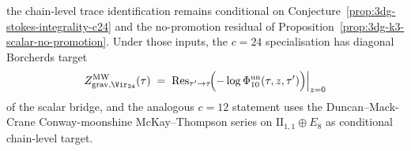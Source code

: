 \begin{conjecture}
\begin{enumerate}[label=\textup{(\Alph*)}]
the chain-level trace identification remains conditional on
Conjecture~\ref{prop:3dg-stokes-integrality-c24} and the
no-promotion residual of
Proposition~\ref{prop:3dg-k3-scalar-no-promotion}. Under those
inputs, the \(c=24\) specialisation has diagonal Borcherds target
\begin{equation}\label{eq:3dg-master-c24-phi10}
 Z^{\mathrm{MW}}_{\mathrm{grav}, \Vir_{24}}(\tau)
 \;=\;
 \Res_{\tau'\to\tau}\!\Bigl(
 -\log \Phi_{10}^{\mathrm{un}}(\tau, z, \tau')
 \Bigr)\Big|_{z = 0}
\end{equation}
of the scalar bridge, and the analogous \(c=12\) statement uses the
Duncan--Mack-Crane \cite{DuncanMackCrane2015} Conway-moonshine
McKay--Thompson series on \(\mathrm{II}_{1,1}\oplus E_{8}\) as
conditional chain-level target.
\end{enumerate}
\end{conjecture}

